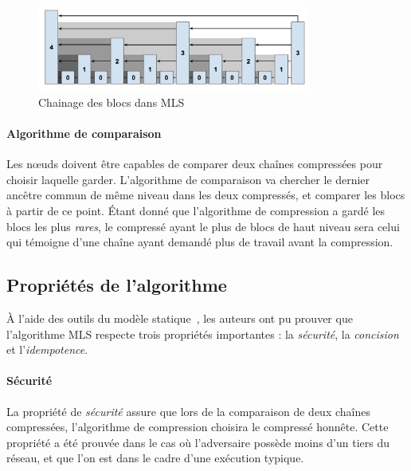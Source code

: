     \vspace{0.4cm}
    \begin{figure}[ht]
        \centering
        \includegraphics[width=0.8\textwidth]{figs/linking.png}
        \caption{Chainage des blocs dans MLS \cite{mls}}
        \label{fig:linking}
    \end{figure}

    
    \paragraph{Algorithme de comparaison} Les nœuds doivent être capables de
    comparer deux chaînes compressées pour choisir laquelle garder. L'algorithme
    de comparaison va chercher le dernier ancêtre commun de même niveau dans les
    deux compressés, et comparer les blocs à partir de ce point. Étant donné que
    l'algorithme de compression a gardé les blocs les plus \textit{rares}, le
    compressé ayant le plus de blocs de haut niveau sera celui qui témoigne
    d'une chaîne ayant demandé plus de travail avant la compression.


    \subsection{Propriétés de l'algorithme}\label{subsec:mls_proprietes}

    À l'aide des outils du modèle statique~\cite{static_backbone}, les auteurs
    ont pu prouver que l'algorithme MLS respecte trois propriétés importantes :
    la \textit{sécurité}, la \textit{concision} et l'\textit{idempotence}.
    
    \paragraph{Sécurité} La propriété de \textit{sécurité} assure que lors de la
    comparaison de deux chaînes compressées, l'algorithme de compression
    choisira le compressé honnête. Cette propriété a été prouvée dans le cas
    où l'adversaire possède moins d'un tiers du réseau, et que l'on est dans le
    cadre d'une exécution typique.

